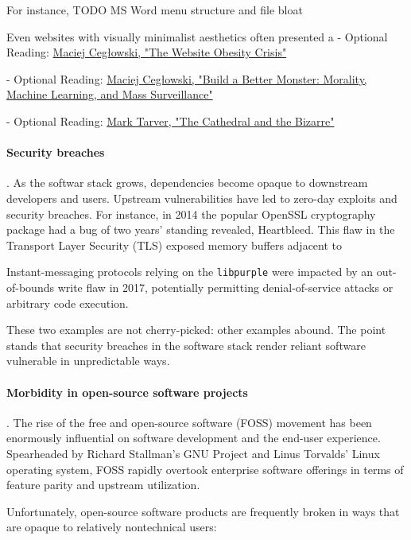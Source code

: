 For instance,
TODO MS Word menu structure and file bloat

Even websites with visually minimalist aesthetics often presented
\citeauthor{Ceglowski2015}
a
- Optional Reading: \href{https://idlewords.com/talks/website_obesity.htm}{Maciej Cegłowski, "The Website Obesity Crisis"}

- Optional Reading: \href{https://idlewords.com/talks/build_a_better_monster.htm}{Maciej Cegłowski, "Build a Better Monster: Morality, Machine Learning, and Mass Surveillance"}

- Optional Reading: \href{http://marktarver.com/thecathedralandthebizarre.html}{Mark Tarver, "The Cathedral and the Bizarre"}


\paragraph{Security breaches}.  As the softwar stack grows, dependencies become opaque to downstream developers and users.  Upstream vulnerabilities have led to zero-day exploits and security breaches.  For instance, in 2014 the popular OpenSSL cryptography package had a bug of two years' standing revealed, Heartbleed.  This flaw in the Transport Layer Security (TLS) exposed memory buffers adjacent to

Instant-messaging protocols relying on the \texttt{libpurple} were impacted by an out-of-bounds write flaw in 2017, potentially permitting denial-of-service attacks or arbitrary code execution.

These two examples are not cherry-picked:  other examples abound.  The point stands that security breaches in the software stack render reliant software vulnerable in unpredictable ways.

\paragraph{Morbidity in open-source software projects}.  The rise of the free and open-source software (FOSS) movement has been enormously influential on software development and the end-user experience.  Spearheaded by Richard Stallman's GNU Project and Linus Torvalds' Linux operating system, FOSS rapidly overtook enterprise software offerings in terms of feature parity and upstream utilization.

Unfortunately, open-source software products are frequently broken in ways that are opaque to relatively nontechnical users:

